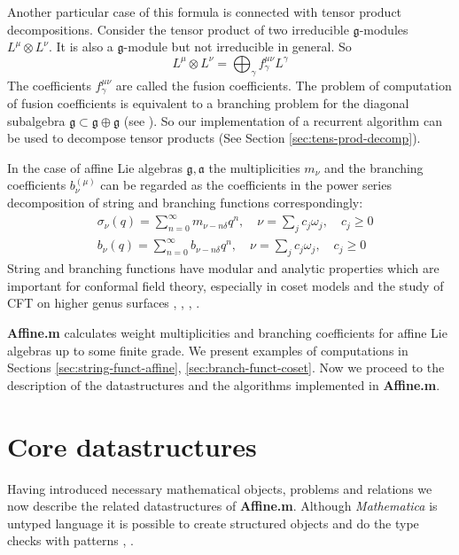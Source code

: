 \documentclass[preprint,12pt]{elsarticle}
\newcommand{\gf}{\mathfrak{g}}
\newcommand{\af}{\mathfrak{a}}
\begin{document}
Another particular case of this formula is connected with tensor
product decompositions. Consider the tensor product of two
irreducible $\gf$-modules $L^{\mu}\otimes L^{\nu}$. It is also a
$\gf$-module but not irreducible in general. So
\begin{equation}
  \label{eq:19}
  L^{\mu}\otimes L^{\nu}=\bigoplus_{\gamma} f^{\mu\nu}_{\gamma}L^{\gamma}
\end{equation}
The coefficients $f^{\mu\nu}_{\gamma}$ are called the fusion
coefficients. The problem of computation of fusion coefficients is
equivalent to a branching problem for the diagonal subalgebra
$\gf\subset \gf\oplus \gf$ (see \cite{LyakhovskyPostnova2011}). So our implementation of a recurrent algorithm can be used to decompose tensor products (See Section \ref{sec:tens-prod-decomp}).

In the case of affine Lie algebras $\gf, \af$  the multiplicities
$m_{\nu}$ and the branching coefficients $b^{(\mu)}_{\nu}$
can be regarded as the coefficients in the power series decomposition
of string and branching functions correspondingly:
\begin{align}
  \label{eq:21}
  &\sigma_{\nu}(q)=\sum_{n=0}^{\infty} m_{\nu-n\delta} q^n, \quad \nu=\sum_j c_j \omega_j,\quad c_j\geq 0\\
  & b_{\nu}(q)=\sum_{n=0}^{\infty} b_{\nu-n\delta} q^n,\quad  \nu=\sum_j c_j \omega_j, \quad c_j\geq 0
\end{align}
String and branching functions have  modular and analytic properties which are important for conformal field theory, especially in  coset models and the study of CFT on higher genus surfaces \cite{kac1988modular}, \cite{difrancesco1997cft}, \cite{Walton:1999xc}, \cite{walton1989conformal}.


{\bf Affine.m}  calculates weight multiplicities and branching coefficients for affine Lie algebras up to some finite grade. We present examples of computations in Sections \ref{sec:string-funct-affine}, \ref{sec:branch-funct-coset}. Now we proceed to the description of the datastructures and the algorithms implemented in {\bf Affine.m}.

\section{Core datastructures}
\label{sec:core-datastructures} Having introduced necessary
mathematical objects, problems and relations we now describe the
related datastructures of {\bf Affine.m}. Although {\it
Mathematica} is untyped language it is possible to create
structured objects and do the type checks with patterns
\cite{shifrinmathematica}, \cite{maeder2000computer}.
\end{document}
